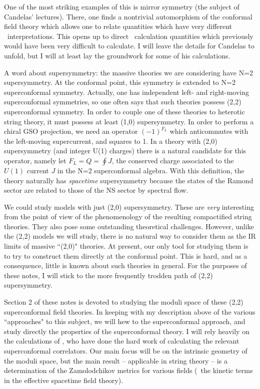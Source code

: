 One of the most striking examples of this is mirror
symmetry (the subject of Candelas' lectures). There, one finds a nontrivial
automorphism of the conformal field theory which allows one to relate
quantities which have very different \sm\ interpretations. This opens up to
direct \sm\ calculation quantities which previously would have been very
difficult to calculate. I will leave the details for Candelas to unfold, but
I will at least lay the groundwork for some of his calculations.


A word about supersymmetry: the massive theories we are considering have N=2
supersymmetry. At the conformal point, this symmetry is extended to N=2
superconformal symmetry. Actually, one has independent left- and right-moving
superconformal symmetries, so one often says that such theories possess
(2,2) superconformal symmetry. In order to couple one of these theories to
heterotic string theory, it must possess at least (1,0) supersymmetry. In
order to perform a chiral GSO projection, we need an operator $(-1)^{F_L}$
which anticommutes with the left-moving supercurrent, and squares to 1. In a
theory with (2,0) supersymmetry (and integer U(1) charges) there is a natural
candidate for this operator, namely let $F_L= Q=\oint J$, the conserved charge
associated to the $U(1)$ current $J$ in the N=2 superconformal algebra. With
this definition, the theory naturally has {\it spacetime} supersymmetry
 because the states of the Ramond sector are related to
those of the NS sector by spectral flow.

We could study models with just (2,0) supersymmetry. These are {\it very}
interesting from the point of view of the phenomenology of the resulting
compactified string theories. They also pose some outstanding theoretical
challenges. However, unlike the (2,2) models we will study, there is no
natural way to consider them as the IR limits of massive ``(2,0)" theories.
At present, our only tool for studying them is to try to  construct them
directly at the conformal point. This is hard, and as a consequence, little
is known about such theories in general. For the purposes of these notes, I
will stick to the more frequently trodden path of (2,2) supersymmetry.

Section 2 of these notes is devoted to studying the moduli space of these
(2,2) superconformal field theories. In keeping with my description above of
the various ``approaches" to this subject, we will hew to the superconformal
approach, and study directly the properties of the superconformal theory. I
will rely heavily on the calculations of \DKL, who have done the hard
work of calculating the relevant superconformal correlators. Our main focus
will be on the intrinsic geometry of the moduli space, but the main result --
applicable in string theory -- is a determination of the Zamolodchikov
metrics  for
various fields (\ie\ the kinetic terms in the effective spacetime field
theory).

